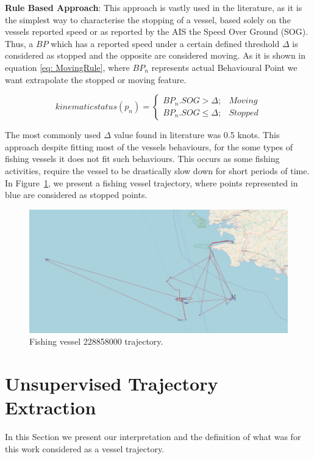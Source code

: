 \textbf{Rule Based Approach}:
This approach is vastly used in the literature, as it is the simplest way to characterise the stopping of a vessel, based solely on the vessels reported speed or as reported by the AIS the Speed Over Ground (SOG). Thus, a $BP$ which has a reported speed under a certain defined threshold $\Delta$ is considered as stopped and the opposite are considered moving. As it is shown in equation \ref{eq: MovingRule}, where $BP_n$ represents actual Behavioural Point we want extrapolate the stopped or moving feature.

\begin{equation}
kinematic status(p_n) = \left\{\begin{matrix}
BP_n.SOG > \Delta; & Moving\\ 
BP_n.SOG \leq  \Delta; & Stopped
\end{matrix}\right.
\label{eq: MovingRule}
\end{equation}

The most commonly used $\Delta$ value found in literature was 0.5 knots.
This approach despite fitting most of the vessels behaviours, for the some types of fishing vessels it does not fit such behaviours. This occurs as some fishing activities, require the vessel to be drastically slow down for short periods of time.
In Figure~\ref{fig: 228858000}, we present a fishing vessel trajectory, where points represented in blue are considered as stopped points.   

\begin{figure}[H]
\centering
\includegraphics[scale = 0.2]{figures/Ch4/simplestopMoving228858000.png}
\caption{Fishing vessel 228858000 trajectory.}
\label{fig: 228858000}
\end{figure}

\section{Unsupervised Trajectory Extraction}
\label{section: 4 Unsupervised Trajectory Extraction}
In this Section we present our interpretation and the definition of what was for this work considered as a vessel trajectory. 


